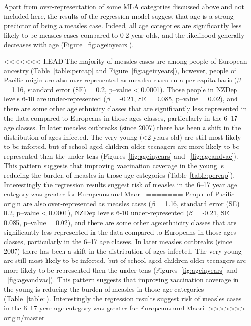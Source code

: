 \documentclass{article}
\begin{document}
\begin{itemize}
\par Apart from over-representation of some MLA categories discussed above and not included here, the results of the regression model suggest that age is a strong predictor of being a measles case. Indeed, all age categories are significantly less likely to be measles cases compared to 0-2 year olds, and the likelihood generally decreases with age (Figure~\ref{fig:ageinyears}).

<<<<<<< HEAD
The majority of measles cases are among people of European ancestry (Table~\ref{table:percap} and Figure~\ref{fig:ageinyears}), however, people of Pacific origin are also over-represented as measles cases on a per capita basis ($\beta$ = 1.16, standard error (SE) = 0.2, p--value < 0.0001). Those people in NZDep levels 6-10 are under-represented ($\beta$ = -0.21, SE = 0.085, p--value = 0.02), and there are some other age:ethnicity classes that are significantly less represented in the data compared to Europeans in those ages classes, particularly in the 6--17 age classes. In later measles outbreaks (since 2007) there has been a shift in the distribution of ages infected. The very young (<2 years old) are still most likely to be infected, but of school aged children older teenagers are more likely to be represented then the under tens (Figures~\ref{fig:ageinyears} and ~\ref{fig:ageandvac}). This pattern suggests that improving vaccination coverage in the young is reducing the burden of measles in those age categories (Table~\ref{table:percap}). Interestingly the regression results suggest risk of measles in the 6--17 year age category was greater for Europeans and Maori.
=======
People of Pacific origin are also over-represented as measles cases ($\beta$ = 1.16, standard error (SE) = 0.2, p--value < 0.0001), NZDep levels 6-10 under-represented ($\beta$ = -0.21, SE = 0.085, p--value = 0.02), and there are some other age:ethnicity classes that are significantly less represented in the data compared to Europeans in those ages classes, particularly in the 6--17 age classes. In later measles outbreaks (since 2007) there has been a shift in the distribution of ages infected. The very young are still most likely to be infected, but of school aged children older teenagers are more likely to be represented then the under tens (Figures~\ref{fig:ageinyears} and ~\ref{fig:ageandvac}). This pattern suggests that improving vaccination coverage in the young is reducing the burden of measles in those age categories (Table~\ref{table:}). Interestingly the regression results suggest risk of measles cases in the 6--17 year age category was greater for Europeans and Maori.
>>>>>>> origin/master


\end{itemize}
\end{document}
